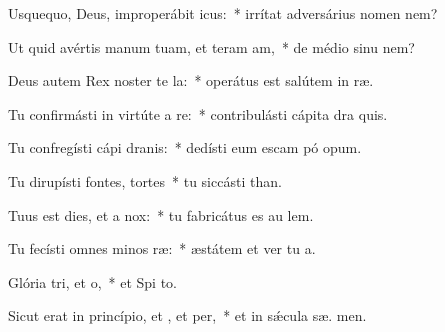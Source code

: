 \item Usquequo, Deus, improperábit icus:~* irrítat adversárius nomen   nem?
\item Ut quid avértis manum tuam, et teram am,~* de médio sinu   nem?
\item Deus autem Rex noster te la:~* operátus est salútem in  ræ.
\item Tu confirmásti in virtúte a re:~* contribulásti cápita dra  quis.
\item Tu confregísti cápi dranis:~* dedísti eum escam pó opum.
\item Tu dirupísti fontes,  tortes~* tu siccásti  than.
\item Tuus est dies, et a  nox:~* tu fabricátus es au  lem.
\item Tu fecísti omnes minos ræ:~* æstátem et ver tu  a.
\item Glória tri, et o,~* et Spi to.
\item Sicut erat in princípio, et , et per,~* et in sǽcula sæ. men.
